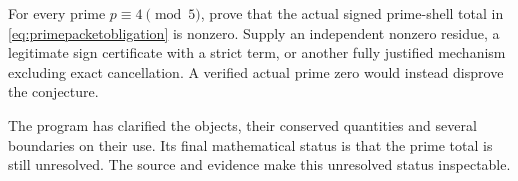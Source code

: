 \begin{openproblem}
For every prime $p\equiv4\pmod5$, prove that the actual signed prime-shell total in \eqref{eq:primepacketobligation} is nonzero. Supply an independent nonzero residue, a legitimate sign certificate with a strict term, or another fully justified mechanism excluding exact cancellation. A verified actual prime zero would instead disprove the conjecture.
\end{openproblem}

The program has clarified the objects, their conserved quantities and several boundaries on their use. Its final mathematical status is that the prime total is still unresolved. The source and evidence make this unresolved status inspectable.
